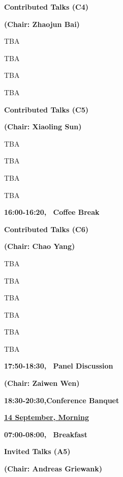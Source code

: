 \centerline{\bf Contributed Talks (C4)} \vskip2mm \centerline{\bf
(Chair: Zhaojun Bai)} \vskip4mm

 {TBA}

 {TBA}

 {TBA}

 {TBA}



\vskip8mm \centerline{\bf Contributed Talks (C5)} \vskip2mm
\centerline{\bf (Chair: Xiaoling Sun) } \vskip4mm

 {TBA}

 {TBA}

 {TBA}

 {TBA}

\vskip8mm \centerline{\bf 16:00-16:20, \ Coffee Break} \vskip8mm


\centerline{\bf Contributed Talks (C6)} \vskip2mm \centerline{\bf
(Chair: Chao Yang) } \vskip4mm

 {TBA}

 {TBA}

 {TBA}

 {TBA}

 {TBA}

 {TBA}


\vskip8mm  \centerline{\bf 17:50-18:30, \ Panel Discussion } 
\vskip2mm  \centerline{\bf (Chair: Zaiwen Wen)}   

\vskip16mm \centerline{\bf 18:30-20:30,\quad Conference Banquet} \vskip16mm


\newpage
\parbox[t]{5cm}{\underline{\bf  14 September,  Morning}}\hskip 2.2cm
\parbox[t]{10cm}{}
\vskip8mm \centerline{\bf 07:00-08:00, \ Breakfast} \vskip10mm
\centerline{\bf  Invited Talks (A5)} \vskip2mm \centerline{\bf
(Chair: Andreas Griewank)} \vskip4mm


